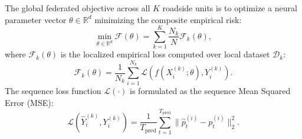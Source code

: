 \documentclass[journal]{IEEEtran}
\begin{document}
The global federated objective across all $K$ roadside units is to optimize a neural parameter vector $\theta \in \mathbb{R}^d$ minimizing the composite empirical risk:
\begin{equation}
\min_{\theta \in \mathbb{R}^d} \mathcal{F}(\theta) = \sum_{k=1}^K \frac{N_k}{N} \mathcal{F}_k(\theta),
\label{eq:fl_objective}
\end{equation}
where $\mathcal{F}_k(\theta)$ is the localized empirical loss computed over local dataset $\mathcal{D}_k$:
\begin{equation}
\mathcal{F}_k(\theta) = \frac{1}{N_k} \sum_{i=1}^{N_k} \mathcal{L}(f(X_i^{(k)}; \theta), Y_i^{(k)}).
\label{eq:local_loss}
\end{equation}
The sequence loss function $\mathcal{L}(\cdot)$ is formulated as the sequence Mean Squared Error (MSE):
\begin{equation}
\mathcal{L}(\hat{Y}_i^{(k)}, Y_i^{(k)}) = \frac{1}{T_{\mathrm{pred}}} \sum_{t=1}^{T_{\mathrm{pred}}} \|\hat{p}_t^{(i)} - p_t^{(i)}\|_2^2.
\label{eq:mse_loss}
\end{equation}
\end{document}
